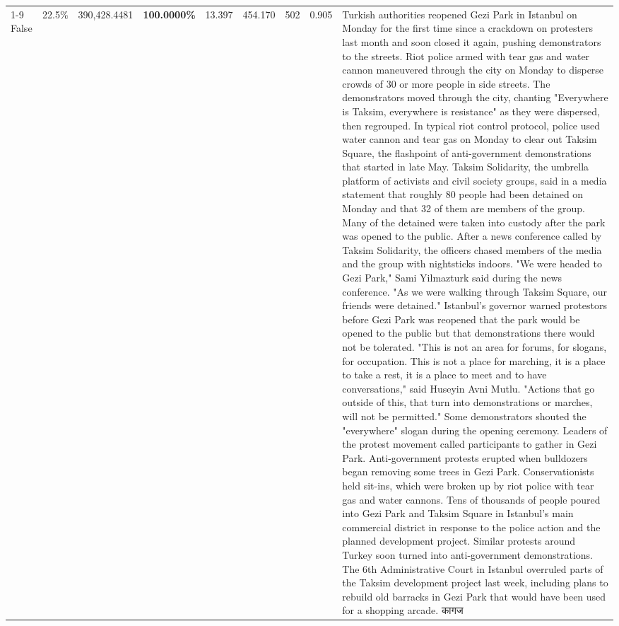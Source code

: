 \begin{table}[H]
\begin{tabular}{lllrlllll}
\cline{1-9}
False & 22.5\% & 390,428.4481 & \bfseries \color{red} 100.0000\% & 13.397 & 454.170 & 502 & 0.905 & Turkish authorities reopened Gezi Park in Istanbul on Monday for the first time since a crackdown on protesters last month and soon closed it again, pushing demonstrators to the streets. Riot police armed with tear gas and water cannon maneuvered through the city on Monday to disperse crowds of 30 or more people in side streets. The demonstrators moved through the city, chanting "Everywhere is Taksim, everywhere is resistance" as they were dispersed, then regrouped. In typical riot control protocol, police used water cannon and tear gas on Monday to clear out Taksim Square, the flashpoint of anti-government demonstrations that started in late May. Taksim Solidarity, the umbrella platform of activists and civil society groups, said in a media statement that roughly 80 people had been detained on Monday and that 32 of them are members of the group. Many of the detained were taken into custody after the park was opened to the public. After a news conference called by Taksim Solidarity, the officers chased members of the media and the group with nightsticks indoors. "We were headed to Gezi Park," Sami Yilmazturk said during the news conference. "As we were walking through Taksim Square, our friends were detained." Istanbul's governor warned protestors before Gezi Park was reopened that the park would be opened to the public but that demonstrations there would not be tolerated. "This is not an area for forums, for slogans, for occupation. This is not a place for marching, it is a place to take a rest, it is a place to meet and to have conversations," said Huseyin Avni Mutlu. "Actions that go outside of this, that turn into demonstrations or marches, will not be permitted." Some demonstrators shouted the "everywhere" slogan during the opening ceremony. Leaders of the protest movement called participants to gather in Gezi Park. Anti-government protests erupted when bulldozers began removing some trees in Gezi Park. Conservationists held sit-ins, which were broken up by riot police with tear gas and water cannons. Tens of thousands of people poured into Gezi Park and Taksim Square in Istanbul's main commercial district in response to the police action and the planned development project. Similar protests around Turkey soon turned into anti-government demonstrations. The 6th Administrative Court in Istanbul overruled parts of the Taksim development project last week, including plans to rebuild old barracks in Gezi Park that would have been used for a shopping arcade. कागज \\

\end{tabular}
\end{table}
